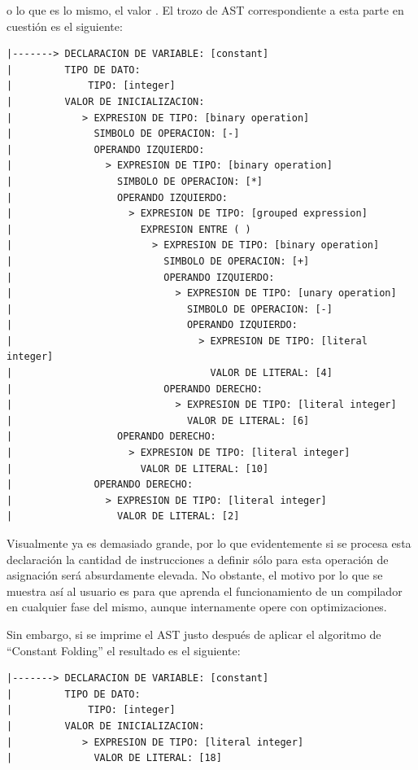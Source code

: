 o lo que es lo mismo, el valor . El trozo de AST correspondiente a esta parte en cuestión es el siguiente:

\begin{verbatim}
|-------> DECLARACION DE VARIABLE: [constant]
|         TIPO DE DATO:
|             TIPO: [integer]
|         VALOR DE INICIALIZACION:
|            > EXPRESION DE TIPO: [binary operation]
|              SIMBOLO DE OPERACION: [-]
|              OPERANDO IZQUIERDO:
|                > EXPRESION DE TIPO: [binary operation]
|                  SIMBOLO DE OPERACION: [*]
|                  OPERANDO IZQUIERDO:
|                    > EXPRESION DE TIPO: [grouped expression]
|                      EXPRESION ENTRE ( )
|                        > EXPRESION DE TIPO: [binary operation]
|                          SIMBOLO DE OPERACION: [+]
|                          OPERANDO IZQUIERDO:
|                            > EXPRESION DE TIPO: [unary operation]
|                              SIMBOLO DE OPERACION: [-]
|                              OPERANDO IZQUIERDO:
|                                > EXPRESION DE TIPO: [literal integer]
|                                  VALOR DE LITERAL: [4]
|                          OPERANDO DERECHO:
|                            > EXPRESION DE TIPO: [literal integer]
|                              VALOR DE LITERAL: [6]
|                  OPERANDO DERECHO:
|                    > EXPRESION DE TIPO: [literal integer]
|                      VALOR DE LITERAL: [10]
|              OPERANDO DERECHO:
|                > EXPRESION DE TIPO: [literal integer]
|                  VALOR DE LITERAL: [2]
\end{verbatim}

Visualmente ya es demasiado grande, por lo que evidentemente si se procesa esta declaración la cantidad de instrucciones a definir sólo para esta operación de asignación será absurdamente elevada. No obstante, el motivo por lo que se muestra así al usuario es para que aprenda el funcionamiento de un compilador en cualquier fase del mismo, aunque internamente opere con optimizaciones.



Sin embargo, si se imprime el AST justo después de aplicar el algoritmo de ``Constant Folding'' el resultado es el siguiente:

\begin{verbatim}
|-------> DECLARACION DE VARIABLE: [constant]
|         TIPO DE DATO:
|             TIPO: [integer]
|         VALOR DE INICIALIZACION:
|            > EXPRESION DE TIPO: [literal integer]
|              VALOR DE LITERAL: [18]

\end{verbatim}

